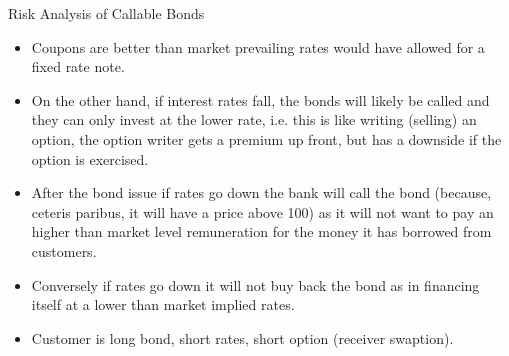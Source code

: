 \documentclass{beamer}
\begin{document}
\begin{frame}{Risk Analysis of Callable Bonds}
	\begin{itemize}
		\item Coupons are better than market prevailing rates would have allowed for a fixed rate note.
		\item On the other hand, if interest rates fall, the bonds will likely be called and they can only invest at the lower rate, i.e. this is like writing (selling) an option, the option writer gets a premium up front, but has a downside if the option is exercised.
		\item After the bond issue if rates go down the bank will call the bond (because, ceteris paribus, it will have a price above 100) as it will not want to pay an higher than market level remuneration for the money it has borrowed from customers.
		\item Conversely if rates go down it will not buy back the bond as in financing itself at a lower than market implied rates.
		
		
		\item Customer is long bond, short rates, short option (receiver swaption).
	\end{itemize}
\end{frame}
\end{document}
